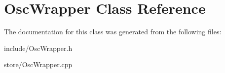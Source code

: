 \hypertarget{classOscWrapper}{\section{Osc\-Wrapper Class Reference}
\label{classOscWrapper}
}


The documentation for this class was generated from the following files\-:\begin{DoxyCompactItemize}
\item 
include/Osc\-Wrapper.\-h\item 
store/Osc\-Wrapper.\-cpp\end{DoxyCompactItemize}
